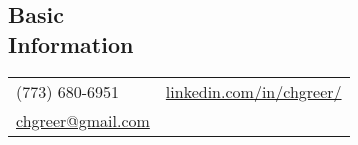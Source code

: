 \documentclass[margin,line, 11pt]{res}
\begin{document}

\begin{resume}
\vspace*{-2mm}
\section{Basic\\Information}
\begin{tabular}{@{}p{4.9in}p{4in}}
  (773) 680-6951 & \href{https://www.linkedin.com/in/chgreer/}{linkedin.com/in/chgreer/} \\
  \href{mailto:chgreer@gmail.com}{chgreer@gmail.com}  \\
\end{tabular}



\end{resume}
\end{document}
